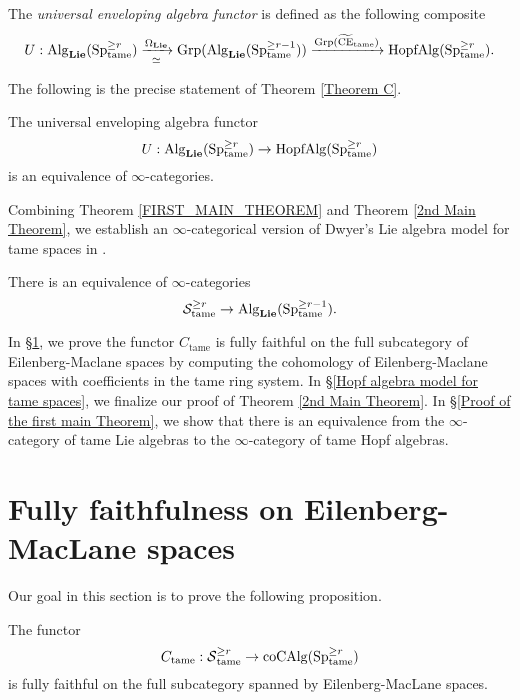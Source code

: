 \begin{definition}
	The \emph{universal enveloping algebra functor} is defined as the following composite
	$$
	U: \operatorname{Alg}_{\mathbf{Lie}}(\operatorname{Sp}^{\geq r}_{\operatorname{\operatorname{tame}}}) 
	\xrightarrow[\simeq]{\Omega_{\mathbf{Lie}}}
	\operatorname{Grp}(\operatorname{Alg}_{\mathbf{Lie}}(\operatorname{Sp}^{\geq r-1}_{\operatorname{\operatorname{tame}}}))
	\xrightarrow{\operatorname{Grp}(\widetilde{\operatorname{CE}}_{\operatorname{\operatorname{tame}}})}
	\operatorname{HopfAlg}(\operatorname{Sp}^{\geq r}_{\operatorname{\operatorname{tame}}}).
	$$
\end{definition}


The following is the precise statement of Theorem \ref{Theorem C}.
\begin{theorem}
\label{FIRST_MAIN_THEOREM}
	The universal enveloping algebra functor
	$$
	U: \operatorname{Alg}_{\mathbf{Lie}}(\operatorname{Sp}^{\geq r}_{\operatorname{\operatorname{tame}}})
	\to
	\operatorname{HopfAlg}(\operatorname{Sp}^{\geq r}_{\operatorname{\operatorname{tame}}})
	$$
	is an equivalence of $\infty$-categories.
\end{theorem}

Combining Theorem \ref{FIRST_MAIN_THEOREM} and Theorem \ref{2nd Main Theorem}, we establish an $\infty$-categorical version of Dwyer's Lie algebra model for tame spaces in \cite{Dwyer}.
\begin{theorem}
\cite{Dwyer}
	There is an equivalence of $\infty$-categories
	\[
	{\mathcal{S}}^{\geq r}_{\operatorname{\operatorname{tame}}} 
	\to
	\operatorname{Alg}_{\mathbf{Lie}}(\operatorname{Sp}^{\geq r-1}_{\operatorname{\operatorname{tame}}}).
	\]
\end{theorem}

In \S \ref{Section: Fully faithfulness on Eilenberg-Maclane spaces}, we prove the functor $C_{\operatorname{tame}}$ is fully faithful on the full subcategory of Eilenberg-Maclane spaces by computing the cohomology of Eilenberg-Maclane spaces with coefficients in the tame ring system.
In \S \ref{Hopf algebra model for tame spaces}, we finalize our proof of Theorem \ref{2nd Main Theorem}.
In \S \ref{Proof of the first main Theorem}, we show that there is an equivalence from the $\infty$-category of tame Lie algebras to the $\infty$-category of tame Hopf algebras. 


\section{Fully faithfulness on Eilenberg-MacLane spaces}\label{Section: Fully faithfulness on Eilenberg-Maclane spaces}

Our goal in this section is to prove the following proposition.
\begin{proposition}
\label{Fully faithfulness of C_tame on EM spaces}
	The functor
	$$
	C_{\operatorname{\operatorname{\operatorname{tame}}}}:\operatorname{\mathcal{S}}^{\geq r}_{\operatorname{\operatorname{tame}}}\to \operatorname{coCAlg}(\operatorname{Sp}^{\geq r}_{\operatorname{\operatorname{tame}}})
	$$
is fully faithful on the full subcategory spanned by Eilenberg-MacLane spaces.
\end{proposition}

